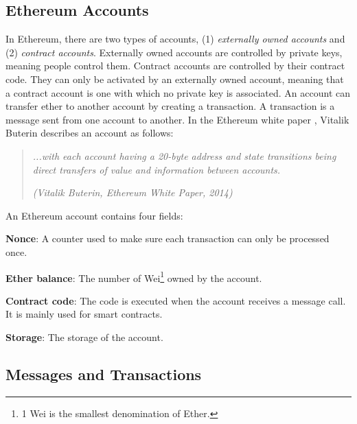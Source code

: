 \subsection{Ethereum Accounts}


In Ethereum, there are two types of accounts, (1) \textit{externally owned accounts} and (2) \textit{contract accounts}. Externally owned accounts are controlled
by private keys, meaning people control them. Contract accounts are controlled by their contract code. They can only be activated by
an externally owned account, meaning that a contract account is one with which no private key is associated.
An account can transfer ether to another account by creating a transaction. A transaction is a message sent from one account to another.
In the Ethereum white paper \cite{ethereum_white_paper}, Vitalik Buterin describes an account as follows:


\begin{quote}
    \textit{...with each account having a 20-byte address and state transitions being direct transfers of value and information between
        accounts.}


    \textit{(Vitalik Buterin, Ethereum White Paper, 2014)}
\end{quote}



An Ethereum account contains four fields:

\begin{list}{-}{}
   \item \textbf{Nonce}: A counter used to make sure each transaction can only be processed once.
   \item  \textbf{Ether balance}: The number of Wei\footnote{1 Wei is the smallest denomination of Ether.} owned by the account.
   \item \textbf{Contract code}: The code is executed when the account receives a message call. It is mainly used for smart contracts.
   \item \textbf{Storage}: The storage of the account.
\end{list}



\subsection{Messages and Transactions}
\label{subsec:messages_and_transactions}


